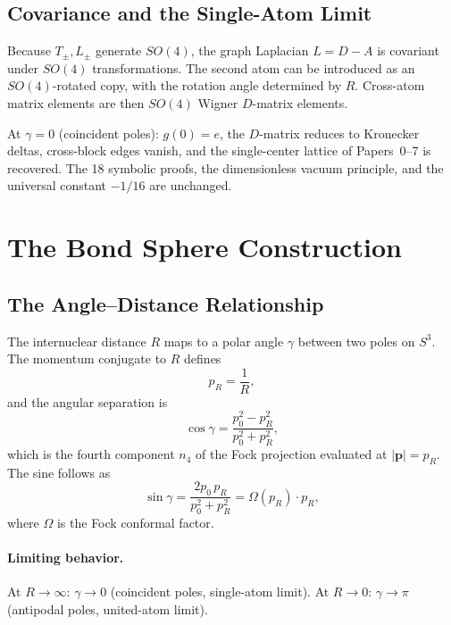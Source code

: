 \documentclass[aps,pra,twocolumn,superscriptaddress,longbibliography]{revtex4-2}
\begin{document}
\subsection{Covariance and the Single-Atom Limit}

Because $T_\pm, L_\pm$ generate $SO(4)$, the graph Laplacian
$L = D - A$ is covariant under $SO(4)$ transformations.  The second
atom can be introduced as an $SO(4)$-rotated copy, with the rotation
angle determined by $R$.  Cross-atom matrix elements are then $SO(4)$
Wigner $D$-matrix elements.

At $\gamma = 0$ (coincident poles): $g(0) = e$, the $D$-matrix reduces
to Kronecker deltas, cross-block edges vanish, and the single-center
lattice of Papers~0--7 is recovered.  The 18 symbolic proofs, the
dimensionless vacuum principle, and the universal constant $-1/16$
are unchanged.


\section{The Bond Sphere Construction}
\label{sec:bond_sphere}

\subsection{The Angle--Distance Relationship}

The internuclear distance $R$ maps to a polar angle $\gamma$ between
two poles on $S^3$.  The momentum conjugate to $R$ defines
\begin{equation}
p_R = \frac{1}{R},
\label{eq:pR}
\end{equation}
and the angular separation is
\begin{equation}
\cos\gamma = \frac{p_0^2 - p_R^2}{p_0^2 + p_R^2},
\label{eq:cos_gamma}
\end{equation}
which is the fourth component $n_4$ of the Fock projection evaluated
at $|\mathbf{p}| = p_R$.  The sine follows as
\begin{equation}
\sin\gamma = \frac{2p_0\, p_R}{p_0^2 + p_R^2} = \Omega(p_R)\cdot p_R,
\label{eq:sin_gamma}
\end{equation}
where $\Omega$ is the Fock conformal factor.

\paragraph{Limiting behavior.}
At $R \to \infty$: $\gamma \to 0$ (coincident poles, single-atom limit).
At $R \to 0$: $\gamma \to \pi$ (antipodal poles, united-atom limit).
\end{document}
